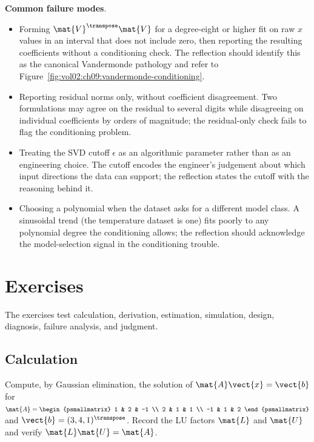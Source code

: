 \begin{project}
\textbf{Common failure modes}.
\begin{itemize}[leftmargin=*]
  \item Forming $\mat{V}^{\transpose}\mat{V}$ for a degree-eight or
    higher fit on raw $x$ values in an interval that does not
    include zero, then reporting the resulting coefficients without
    a conditioning check. The reflection should identify this as
    the canonical Vandermonde pathology and refer to
    Figure~\ref{fig:vol02:ch09:vandermonde-conditioning}.
  \item Reporting residual norms only, without coefficient
    disagreement. Two formulations may agree on the residual to
    several digits while disagreeing on individual coefficients by
    orders of magnitude; the residual-only check fails to flag the
    conditioning problem.
  \item Treating the SVD cutoff $\epsilon$ as an algorithmic
    parameter rather than as an engineering choice. The cutoff
    encodes the engineer's judgement about which input directions
    the data can support; the reflection states the cutoff with the
    reasoning behind it.
  \item Choosing a polynomial when the dataset asks for a different
    model class. A sinusoidal trend (the temperature dataset is
    one) fits poorly to any polynomial degree the conditioning
    allows; the reflection should acknowledge the model-selection
    signal in the conditioning trouble.
\end{itemize}
\end{project}

\section{Exercises}

The exercises test calculation, derivation, estimation, simulation,
design, diagnosis, failure analysis, and judgment.

\subsection*{Calculation}

\begin{exercise}
Compute, by Gaussian elimination, the solution of $\mat{A}\vect{x}
= \vect{b}$ for $\mat{A} = \begin{psmallmatrix} 1 & 2 & -1 \\ 2 &
1 & 1 \\ -1 & 1 & 2 \end{psmallmatrix}$ and $\vect{b} = (3, 4,
1)^{\transpose}$. Record the LU factors $\mat{L}$ and $\mat{U}$
and verify $\mat{L}\mat{U} = \mat{A}$.
\end{exercise}

